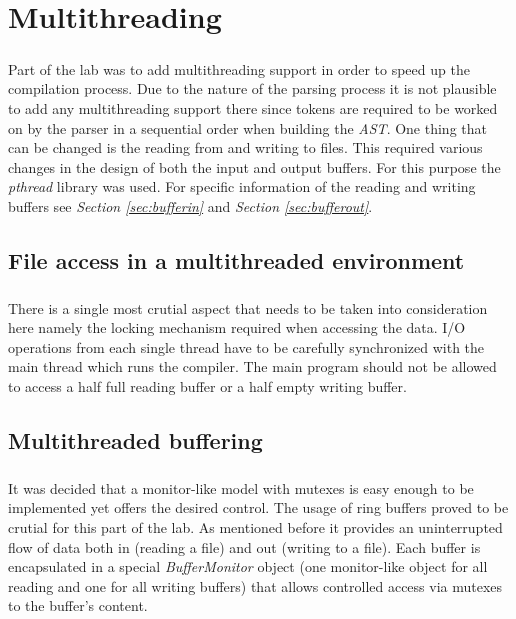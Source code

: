\chapter{Multithreading}
\label{chapter:multithreading}
\paragraph{}
	Part of the lab was to add multithreading support in order to speed up the compilation process. Due to the nature of the parsing process it is not plausible to add any multithreading support there since tokens are required to be worked on by the parser in a sequential order when building the \textit{AST}. One thing that can be changed is the reading from and writing to files. This required various changes in the design of both the input and output buffers. For this purpose the \textit{pthread} library was used. For specific information of the reading and writing buffers see \textit{Section \ref{sec:bufferin}} and \textit{Section \ref{sec:bufferout}}.
	
	\section{File access in a multithreaded environment}
	\paragraph{}
		There is a single most crutial aspect that needs to be taken into consideration here namely the locking mechanism required when accessing the data. I/O operations from each single thread have to be carefully synchronized with the main thread which runs the compiler. The main program should not be allowed to access a half full reading buffer or a half empty writing buffer.
		
	\section{Multithreaded buffering}
	\label{sec:multibuff}
	\paragraph{}
		It was decided that a monitor-like model with mutexes is easy enough to be implemented yet offers the desired control. The usage of ring buffers proved to be crutial for this part of the lab. As mentioned before it provides an uninterrupted flow of data both in (reading a file) and out (writing to a file). Each buffer is encapsulated in a special \textit{BufferMonitor} object (one monitor-like object for all reading and one for all writing buffers) that allows controlled access via mutexes to the buffer's content.
		
